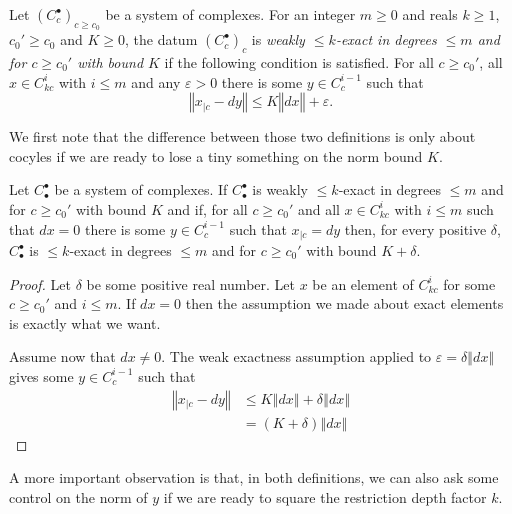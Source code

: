 \begin{definition}
  \label{is_weak_bounded_exact}
  \leanok
  Let $(C_c^\bullet)_{c\geq c_0}$ be a system of complexes.
  For an integer $m\geq 0$ and reals $k \ge 1$, $c_0'\geq c_0$ and $K\geq0$,
  the datum $(C_c^\bullet)_c$ is
  \emph{weakly $\leq k$-exact in degrees $\leq m$ and for $c\geq c_0'$ with bound $K$} if the following condition is satisfied.
  For all $c\geq c_0'$, all $x\in C_{kc}^i$ with $i\leq m$ and any $ε > 0$
  there is some $y\in C_c^{i-1}$ such that
  \[
    ‖x_{|c} - dy‖ ≤ K ‖dx‖ + ε.
  \]
\end{definition}

We first note that the difference between those two definitions is only about
cocyles if we are ready to lose a tiny something on the norm bound $K$.



\begin{lemma}
  \label{is_bounded_exact_of_weakly}
  Let $C_\bullet^\bullet$ be a system of complexes. If $C_\bullet^\bullet$ is
  weakly $\leq k$-exact in degrees $\leq m$ and for $c\geq c_0'$ with bound $K$ and if,
  for all $c\geq c_0'$ and all $x\in C_{kc}^i$ with $i\leq m$ such that $dx = 0$
  there is some $y\in C_c^{i-1}$  such that
  $x_{|c} = dy$ then, for every positive $δ$,
  $C_\bullet^\bullet$ is $\leq k$-exact in degrees $\leq m$ and for $c\geq c_0'$ with
  bound $K + δ$.
\end{lemma}

\begin{proof}
  \leanok
  Let $δ$ be some positive real number.
  Let $x$ be an element of $C_{kc}^i$ for some $c ≥ c_0'$ and $i ≤ m$. If $dx = 0$
  then the assumption we made about exact elements is exactly what we want.

  Assume now that $dx ≠ 0$. The weak exactness assumption applied to $ε = δ‖dx‖$
  gives some $y\in C_c^{i-1}$ such that
  \begin{align*}
    ‖x_{|c} - dy‖ &≤ K‖dx‖ + δ‖dx‖ \\
                  &= (K + δ)‖dx‖
  \end{align*}
\end{proof}

A more important observation is that, in both definitions, we can also ask some
control on the norm of $y$ if we are ready to square the restriction depth factor $k$.

